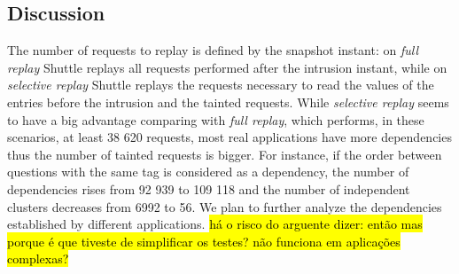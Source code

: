 \subsection{Discussion}\label{sec:eval:accuracy:discussion}
The number of requests to replay is defined by the snapshot instant: on \textit{full replay} Shuttle replays all requests performed after the intrusion instant, while on \textit{selective replay} Shuttle replays the requests necessary to read the values of the entries before the intrusion and the tainted requests. While \textit{selective replay} seems to have a big advantage comparing with  \textit{full replay}, which performs, in these scenarios, at least 38 620 requests, most real applications have more dependencies thus the number of tainted requests is bigger. For instance, if the order between questions with the same tag is considered as a dependency,  the number of dependencies rises from 92 939 to 109 118 and the number of independent clusters decreases from 6992 to 56. We plan to further analyze the dependencies established by different applications. \hl{há o risco do arguente dizer: então mas porque é que tiveste de simplificar os testes? não funciona em aplicações complexas?}







